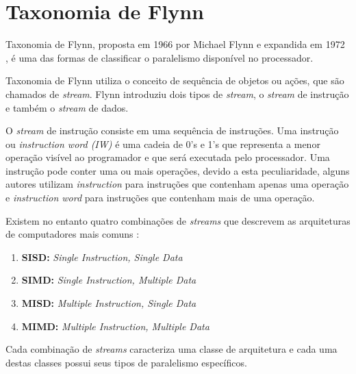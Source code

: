 \section{Taxonomia de Flynn}

Taxonomia de Flynn, proposta em 1966 \cite{Flynn:1966} por Michael 
Flynn e expandida em 1972 \cite{Flynn:1972}, é uma das formas de classificar o 
paralelismo disponível no processador.  

Taxonomia de Flynn utiliza o conceito de sequência de objetos ou ações, que são
chamados de \textit{stream}.
Flynn introduziu dois tipos de \textit{stream}, o 
\textit{stream} de instrução e também o \textit{stream} de dados. 

O \textit{stream} de instrução consiste em uma sequência de instruções. 
Uma instrução ou \textit{instruction word (IW)} é uma cadeia de 0's e 1's que 
representa a menor operação visível ao programador e que será executada pelo 
processador. 
Uma instrução pode conter uma ou mais operações, devido a esta peculiaridade,
alguns autores utilizam \textit{instruction} para instruções que contenham 
apenas uma operação e \textit{instruction word} para instruções que contenham 
mais de uma operação.

\begin{comment}
Processadores escalares (\textit{scalar processors}) e processadores
superescalares (\textit{superscalar processors}) executam uma ou mais
\textit{instructions} por ciclo de \textit{clock} da máquina. 
\end{comment}

Existem no entanto quatro combinações de \textit{streams} que descrevem as 
arquiteturas de computadores mais comuns \cite{Flynn:1996}:

\begin{enumerate}
        \item \textbf{SISD:} \textit{Single Instruction, Single Data}
        \item \textbf{SIMD:} \textit{Single Instruction, Multiple Data}
        \item \textbf{MISD:} \textit{Multiple Instruction, Single Data}
        \item \textbf{MIMD:} \textit{Multiple Instruction, Multiple Data}
\end{enumerate}

Cada combinação de \textit{streams} caracteriza uma classe de arquitetura 
e cada uma destas classes possui seus tipos de paralelismo específicos.



